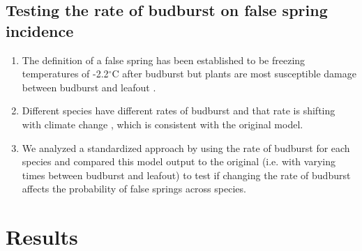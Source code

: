 \documentclass{article}\usepackage[]{graphicx}\usepackage[]{color}
\begin{document}
\subsection*{Testing the rate of budburst on false spring incidence}
\begin{enumerate}
\item The definition of a false spring has been established to be freezing temperatures of -2.2$^{\circ}$C \citep{Schwartz1993} after budburst but plants are most susceptible damage between budburst and leafout \citep{Augspurger2013, Lenz2016}.
\item Different species have different rates of budburst and that rate is shifting with climate change \citep{Cleland2006, Fu2015, Xin2016}, which is consistent with the original model.
\item We analyzed a standardized approach by using the rate of budburst for each species and compared this model output to the original (i.e. with varying times between budburst and leafout) to test if changing the rate of budburst affects the probability of false springs across species.
\end{enumerate}

\section*{Results}
\end{document}
